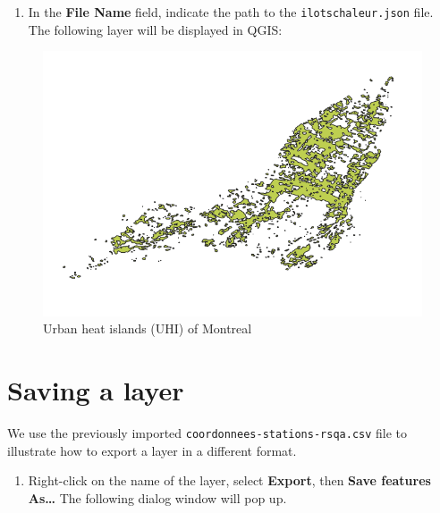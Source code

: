 \documentclass[]{book}
\providecommand{\tightlist}{%
  \setlength{\itemsep}{0pt}\setlength{\parskip}{0pt}}
\theoremstyle{definition}
\theoremstyle{definition}
\theoremstyle{definition}
\theoremstyle{remark}
\begin{document}
\begin{enumerate}
\def\labelenumi{\arabic{enumi}.}
\setcounter{enumi}{1}
\tightlist
\item
  In the \textbf{File Name} field, indicate the path to the
  \texttt{ilotschaleur.json} file. The following layer will be displayed
  in QGIS:
\end{enumerate}

\begin{figure}

{\centering \includegraphics[width=9.46in]{figures/Import_geojson_2} 

}

\caption{Urban heat islands (UHI) of Montreal}\label{fig:unnamed-chunk-8}
\end{figure}

\section{Saving a layer}\label{saveLayer}

We use the previously imported \texttt{coordonnees-stations-rsqa.csv}
file to illustrate how to export a layer in a different format.

\begin{enumerate}
\def\labelenumi{\arabic{enumi}.}
\tightlist
\item
  Right-click on the name of the layer, select \textbf{Export}, then
  \textbf{Save features As\ldots{}} The following dialog window will pop
  up.
\end{enumerate}
\end{document}
